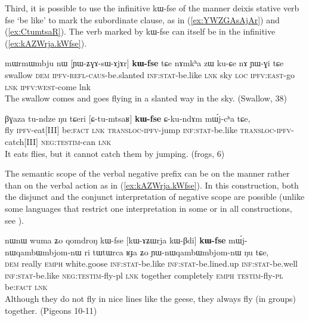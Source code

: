 \documentclass[oldfontcommands,oneside,a4paper,11pt]{article}
\newcommand{\ipa}[1]{{\phon \mbox{#1}}} %
\newcommand{\refb}[1]{(\ref{#1})}
\begin{document}
 

Third, it is possible to use the infinitive   \ipa{kɯ-fse} of the manner deixis stative verb \ipa{fse} `be like' to mark the subordinate clause, as in \refb{ex:YWZGAsAjAr} and \refb{ex:CtumtsaR}. The verb  marked by   \ipa{kɯ-fse} can itself be in the infinitive \refb{ex:kAZWrja.kWfse}.

\begin{exe}
\ex \label{ex:YWZGAsAjAr}
\gll
 	\ipa{mɯrmɯmbju} 	\ipa{nɯ} 	[\ipa{ɲɯ-ʑɣɤ-sɯ-ɤjɤr}] 	\ipa{\textbf{kɯ-fse}} 	\ipa{tɕe} 	\ipa{nɤmkʰa} 	\ipa{zɯ} 	\ipa{ku-ɕe} 	\ipa{nɤ} 	\ipa{ɲɯ-ɣi} 	\ipa{tɕe} 	\\
 	swallow \textsc{dem} \textsc{ipfv-refl-caus}-be.slanted \textsc{inf:stat}-be.like \textsc{lnk} sky \textsc{loc}  \textsc{ipfv:east}-go \textsc{lnk} \textsc{ipfv:west}-come lnk \\
\glt The swallow comes and goes flying in a slanted way in the sky. (Swallow, 38)
\end{exe}

\begin{exe}
\ex \label{ex:CtumtsaR}
\gll
\ipa{βɣaza}         	\ipa{tu-ndze}         	\ipa{ŋu}         	\ipa{tɕeri}         	[\ipa{ɕ-tu-mtsaʁ}]         	\ipa{\textbf{kɯ-fse}}         	\ipa{ɕ-ku-ndɤm}         	\ipa{mɯ́j-cʰa}         	\ipa{tɕe,}         \\
fly \textsc{ipfv}-eat[III] be:\textsc{fact} \textsc{lnk} \textsc{transloc-ipfv}-jump  \textsc{inf:stat}-be.like  \textsc{transloc-ipfv}-catch[III] \textsc{neg:testim}-can \textsc{lnk} \\
\glt It eats flies, but it cannot catch them by jumping. (frogs, 6)
\end{exe}

The semantic scope of the verbal negative prefix can be on the manner rather than on the verbal action as in \refb{ex:kAZWrja.kWfse}.  In this construction, both the disjunct and the conjunct interpretation of negative scope are possible (unlike some languages that restrict one interpretation in some or in all constructions, see \citealt[61]{bickel10linking}).

\begin{exe}
\ex \label{ex:kAZWrja.kWfse}
\gll
\ipa{nɯnɯ} 	\ipa{wuma} 	\ipa{ʑo} 	\ipa{qomdroŋ} 	\ipa{kɯ-fse} 	[\ipa{kɯ-ɤʑɯrja} 	\ipa{kɯ-βdi}] 	\ipa{\textbf{kɯ-fse}} 	\ipa{mɯ́j-nɯqambɯmbjom-nɯ} 	\ipa{ri} \ipa{tɯtɯrca} 	\ipa{ʁɟa} 	\ipa{ʑo} 	\ipa{ɲɯ-nɯqambɯmbjom-nɯ} 	\ipa{ŋu} 	\ipa{tɕe,} \\
\textsc{dem} really \textsc{emph} white.goose  \textsc{inf:stat}-be.like  \textsc{inf:stat}-be.lined.up   \textsc{inf:stat}-be.well \textsc{inf:stat}-be.like \textsc{neg:testim}-fly-pl \textsc{lnk} together completely \textsc{emph} \textsc{testim}-fly-\textsc{pl} be:\textsc{fact} \textsc{lnk} \\
\glt Although they do not fly in nice lines like the geese, they always fly (in groups) together. (Pigeons 10-11)
\end{exe}
 
\end{document}
